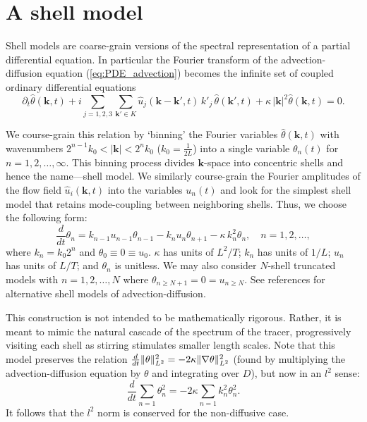 \section{A shell model}
\label{sec:ashellmodel}
Shell models are coarse-grain versions of the spectral representation of a partial differential equation. In particular the Fourier transform of the advection-diffusion equation (\ref{eq:PDE_advection}) becomes the infinite set of coupled ordinary differential equations
\begin{equation*}
	\partial_{t}\hat{\theta}(\mathbf{k},t)+i\sum_{j= 1,2,3}\sum_{\mathbf{k}'\in K}\hat{u}_{j}(\mathbf{k}-\mathbf{k}',t) \, k'_{j} \, \hat{\theta}(\mathbf{k}',t)+ \kappa \, |\mathbf{k}|^2\hat{\theta}(\mathbf{k},t)=0.
\end{equation*}


We course-grain this relation by `binning' the Fourier variables $\hat{\theta}(\mathbf{k},t)$ with wavenumbers $2^{n-1} k_{0}<|\mathbf{k}|<2^n k_{0} $ ($k_{0} = \frac{1}{2L}$) into a single variable $\theta_{n}(t)$ for $n=1,2, \dots ,\infty$. This binning process divides $\mathbf{k}$-space into concentric shells and hence the name---shell model. We similarly course-grain the Fourier amplitudes of the flow field $\hat{u}_{i}(\mathbf{k},t)$ into the variables $u_{n}(t)$ and look for the simplest shell model that retains mode-coupling between neighboring shells.
Thus, we choose the following form:
\begin{equation}
	\label{eq:shellNN_advection}
	\frac{d}{dt} \theta_{n}= k_{n-1}u_{n-1}\theta_{n-1}-k_{n}u_{n}\theta_{n+1} - \kappa \,  k_{n}^{2} \theta_{n}, \quad n=1,2,\dots,
\end{equation}
where $k_{n}=k_{0}2^{n}$ and $\theta_{0} \equiv 0 \equiv u_{0}$. $\kappa$ has units of $L^{2}/T$; $k_{n}$ has units of $1/L$; $u_{n}$ has units of $L/T$; and $\theta_{n}$ is unitless.
We may also consider $N$-shell truncated models with $n=1,2,\dots, N$ where $\theta_{n \ge N+1} = 0 = u_{n \ge N}$. See references \cite{MHJ,wirth1996,PD2010} for alternative shell models of advection-diffusion. 

This construction is not intended to be mathematically rigorous. Rather, it is meant to mimic the natural cascade of the spectrum of the tracer, progressively visiting each shell as stirring stimulates smaller length scales. Note that this model preserves the relation $\frac{d}{dt}\|\theta\|_{L^{2}}^2 = -2\kappa \| \nabla \theta\|_{L^{2}}^2$ (found by multiplying the advection-diffusion equation by $\theta$ and integrating over $D$), but now in an $l^{2}$ sense:
\begin{equation}
	\label{eq:shell_L2decay}
	\frac{d}{dt}\sum_{n=1}^{}\theta_{n}^2=- 2\kappa \sum_{n=1}^{}k_{n}^2\theta_{n}^2.
\end{equation}
It follows that the $l^{2}$ norm is conserved for the non-diffusive case.

